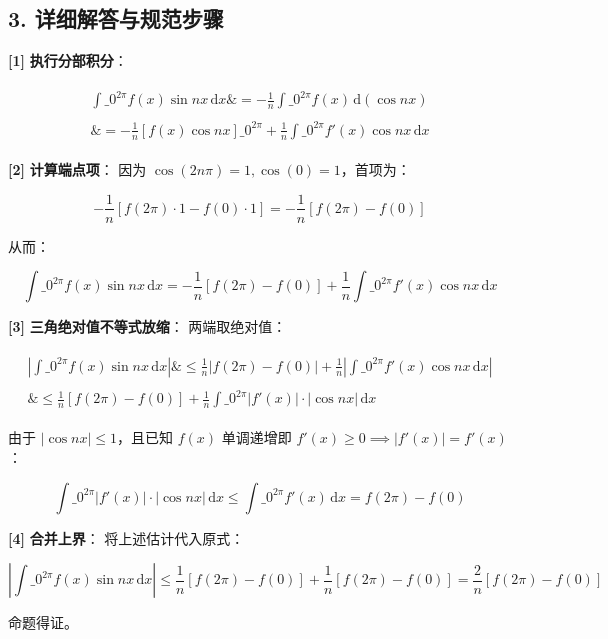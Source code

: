 \documentclass[11pt,a4paper,UTF8]{ctexart}
\begin{document}
\subsection{3. 详细解答与规范步骤}
\begin{solbox}[分步推导与答题规范]
\textbf{[1]}  \textbf{执行分部积分}：

\begin{align*}
\begin{aligned}
\int\_0^{2\pi} f(x)\sin nx\,\mathrm{d}x \&= -\frac{1}{n}\int\_0^{2\pi} f(x)\,\mathrm{d}(\cos nx) \\ \\
\&= -\frac{1}{n}\left[ f(x)\cos nx \right]\_0^{2\pi} + \frac{1}{n}\int\_0^{2\pi} f'(x)\cos nx\,\mathrm{d}x
\end{aligned}
\end{align*}


\textbf{[2]}  \textbf{计算端点项}：
因为 $\cos(2n\pi) = 1, \cos(0) = 1$，首项为：

\begin{equation*}
-\frac{1}{n}[f(2\pi) \cdot 1 - f(0) \cdot 1] = -\frac{1}{n}[f(2\pi) - f(0)]
\end{equation*}

从而：

\begin{equation*}
\int\_0^{2\pi} f(x)\sin nx\,\mathrm{d}x = -\frac{1}{n}[f(2\pi) - f(0)] + \frac{1}{n}\int\_0^{2\pi} f'(x)\cos nx\,\mathrm{d}x
\end{equation*}


\textbf{[3]}  \textbf{三角绝对值不等式放缩}：
两端取绝对值：

\begin{align*}
\begin{aligned}
\left| \int\_0^{2\pi} f(x)\sin nx\,\mathrm{d}x \right| \&\le \frac{1}{n}|f(2\pi) - f(0)| + \frac{1}{n}\left| \int\_0^{2\pi} f'(x)\cos nx\,\mathrm{d}x \right| \\ \\
\&\le \frac{1}{n}[f(2\pi) - f(0)] + \frac{1}{n}\int\_0^{2\pi} |f'(x)| \cdot |\cos nx|\,\mathrm{d}x
\end{aligned}
\end{align*}

由于 $|\cos nx| \le 1$，且已知 $f(x)$ 单调递增即 $f'(x) \ge 0 \implies |f'(x)| = f'(x)$：

\begin{equation*}
\int\_0^{2\pi} |f'(x)| \cdot |\cos nx|\,\mathrm{d}x \le \int\_0^{2\pi} f'(x)\,\mathrm{d}x = f(2\pi) - f(0)
\end{equation*}


\textbf{[4]}  \textbf{合并上界}：
将上述估计代入原式：

\begin{equation*}
\left| \int\_0^{2\pi} f(x)\sin nx\,\mathrm{d}x \right| \le \frac{1}{n}[f(2\pi) - f(0)] + \frac{1}{n}[f(2\pi) - f(0)] = \frac{2}{n}[f(2\pi) - f(0)]
\end{equation*}

命题得证。
\end{solbox}
\end{document}
